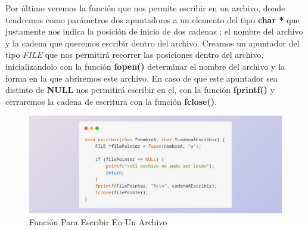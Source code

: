 \documentclass[10pt]{article}
\begin{document}
	\newpage
	Por último veremos la función que nos permite escribir en un archivo, donde tendremos como parámetros dos apuntadores a un elemento del tipo \textbf{char *} que justamente nos indica la posición de inicio de dos cadenas ; el nombre del archivo y la cadena que queremos escribir dentro del archivo.
	Creamos un apuntador del tipo \textit{FILE} que nos permitirá recorrer las posiciones dentro del archivo, inicializandolo con la función \textbf{fopen()} determinar el nombre del archivo y la forma en la que abriremos este archivo. 
	En caso de que este apuntador sea distinto de \textbf{NULL} nos permitirá escribir en el, con la función \textbf{fprintf()} y cerraremos la cadena de escritura con la función \textbf{fclose()}.
	\begin{figure}[h!]
		\centering
		\includegraphics[width=\linewidth]{escritura.png}
		\caption{Función Para Escribir En Un Archivo}
		\label{fig:escritura}
	\end{figure}
\end{document}
